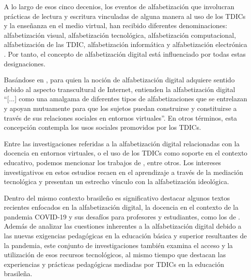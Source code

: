 \documentclass{textolivre}
\begin{document}
A lo largo de esos cinco decenios, los eventos de alfabetización que involucran prácticas de lectura y escritura vinculadas de alguna manera al uso de los TDICs y la enseñanza en el medio virtual, han recibido diferentes denominaciones: alfabetización visual, alfabetización tecnológica, alfabetización computacional, alfabetización de las TDIC, alfabetización informática y alfabetización electrónica \cite{araujo_letramento_2014}. Por tanto, el concepto de alfabetización digital está influenciado por todas estas designaciones. 

Basándose en \textcite{buzato_desafios_2007}, para quien la noción de alfabetización digital adquiere sentido debido al aspecto transcultural de Internet, \textcite[p. 301]{araujo_letramento_2014} entienden la alfabetización digital “[...] como una amalgama de diferentes tipos de alfabetizaciones que se entrelazan y apoyan mutuamente para que los sujetos puedan construirse y constituirse a través de sus relaciones sociales en entornos virtuales”. En otros términos, esta concepción contempla los usos sociales promovidos por los TDICs.

Entre las investigaciones referidas a la alfabetización digital relacionadas con la docencia en entornos virtuales, o el uso de los TDICs como soporte en el contexto educativo, podemos mencionar los trabajos de \textcite{coscarelli__letramento_2011, signorini_letramentos_2012, komesu_letramentos_2013, araujo_letramento_2014, vidotti_de_rezende_o_2016, ribeiro_tecnologia_2016}, entre otros. Los intereses investigativos en estos estudios recaen en el aprendizaje a través de la mediación tecnológica y presentan un estrecho vínculo con la alfabetización ideológica.

Dentro del mismo contexto brasileño es significativo destacar algunos textos recientes enfocados en la alfabetización digital, la docencia en el contexto de la pandemia COVID-19 y sus desafíos para profesores y estudiantes, como los de \textcite{almeida_letramento_2020, arruda__educacao_2020, carneiro_uso_2020, silva_letramento_2020}. Además de analizar las cuestiones inherentes a la alfabetización digital debido a las nuevas exigencias pedagógicas en la educación básica y superior resultantes de la pandemia, este conjunto de investigaciones también examina el acceso y la utilización de esos recursos tecnológicos, al mismo tiempo que destacan las experiencias y prácticas pedagógicas mediadas por TDICs en la educación brasileña.
\end{document}
